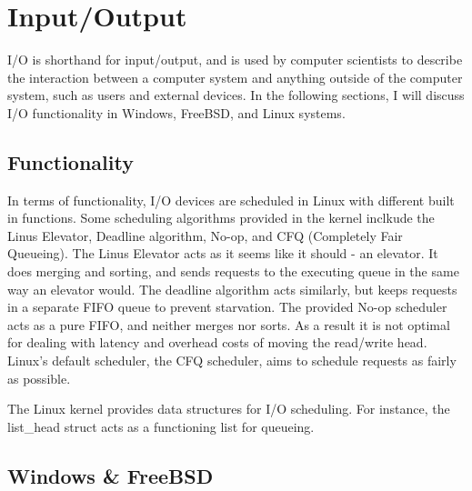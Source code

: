 \documentclass[journal, letterpaper, draftclsnofoot, onecolumn, 10pt]{journal}
\begin{document}
\section{Input/Output}

I/O is shorthand for input/output, and is used by computer scientists to describe the interaction between a computer system and anything outside of the computer system, such as users and external devices.
In the following sections, I will discuss I/O functionality in Windows, FreeBSD, and Linux systems.

\subsection{Functionality}

In terms of functionality, I/O devices are scheduled in Linux with different built in functions. Some scheduling algorithms provided in the kernel inclkude the Linus Elevator, Deadline algorithm, No-op, and CFQ (Completely Fair Queueing).
The Linus Elevator acts as it seems like it should - an elevator. It does merging and sorting, and sends requests to the executing queue in the same way an elevator would. The deadline algorithm acts similarly, but keeps requests in a separate FIFO queue to
prevent starvation. The provided No-op scheduler acts as a pure FIFO, and neither merges nor sorts. As a result it is not optimal for dealing with latency and overhead costs of moving the read/write head. Linux's default scheduler, the CFQ scheduler, aims to schedule requests as fairly as possible.

The Linux kernel provides data structures for I/O scheduling. For instance, the list\_head struct acts as a functioning list for queueing.

\subsection{Windows \& FreeBSD}



\FloatBarrier
\end{document}
